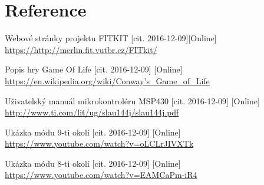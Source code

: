 \documentclass[12pt,a4paper,titlepage]{article}
\begin{document}
\section*{Reference}
\begin{enumerate}[label={[\arabic*]}]
\item Webové stránky projektu FITKIT [cit. 2016-12-09][Online] \\
     \href{https://http://merlin.fit.vutbr.cz/FITkit/}
          {https://http://merlin.fit.vutbr.cz/FITkit/}
     \label{fitkit}
\item Popis hry Game Of Life [cit. 2016-12-09] [Online] \\
    \href{https://en.wikipedia.org/wiki/Conway's\_Game\_of\_Life}
         {https://en.wikipedia.org/wiki/Conway's\_Game\_of\_Life}
    \label{game-of-life}
\item Uživatelský manuál mikrokontroléru MSP430 [cit. 2016-12-09] [Online] \\
    \href{http://www.ti.com/lit/ug/slau144j/slau144j.pdf}
         {http://www.ti.com/lit/ug/slau144j/slau144j.pdf}
    \label{msp430}
\item Ukázka módu 9-ti okolí [cit. 2016-12-09] [Online] \\
    \href{https://www.youtube.com/watch?v=oLCLrJIVXTk}
         {https://www.youtube.com/watch?v=oLCLrJIVXTk}
    \label{video9neighbour}
\item Ukázka módu 8-ti okolí [cit. 2016-12-09] [Online] \\
    \href{https://www.youtube.com/watch?v=EAMCaPm-iR4}
         {https://www.youtube.com/watch?v=EAMCaPm-iR4}
    \label{video8neighbour}
\end{enumerate}
\end{document}
